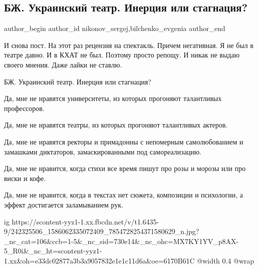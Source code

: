  
 
 
 
 
 
\subsection{БЖ. Украинский театр. Инерция или стагнация?}
\label{sec:21_09_2021.fb.nikonov_sergej.5.bilchenko_recenzia_teatr_inercia_ili_stagnacia}
 
\ifcmt
 author_begin
   author_id nikonov_sergej,bilchenko_evgenia
 author_end
\fi

И снова пост. На этот раз рецензия на спектакль. Причем негативная. Я не был в
театре давно. И в КХАТ не был. Поэтому просто репощу. И никак не выдаю своего
мнения. Даже лайки не ставлю. 

БЖ. Украинский театр. Инерция или стагнация?

Да, мне не нравятся университеты, из которых прогоняют талантливых профессоров.

Да, мне не нравятся театры, из которых прогоняют талантливых актеров.

Да, мне не нравятся ректоры и примадонны с непомерным самолюбованием и
замашками диктаторов, замаскированными под самореализацию.

Да, мне не нравится, когда стихи все время пишут про розы и морозы или про
виски и кофе.

Да, мне не нравится, когда в текстах нет сюжета, композиции и психологии, а
эффект достигается заламыванием рук.

\ifcmt
  ig https://scontent-yyz1-1.xx.fbcdn.net/v/t1.6435-9/242325506_1586062335072409_7854728254371580629_n.jpg?_nc_cat=106&ccb=1-5&_nc_sid=730e14&_nc_ohc=MX7KY1YV_p8AX-5_R0i&_nc_ht=scontent-yyz1-1.xx&oh=e33dc02877a3b3a9057832e1e1c11d6a&oe=6170B61C
  @width 0.4
  @wrap 
\fi


